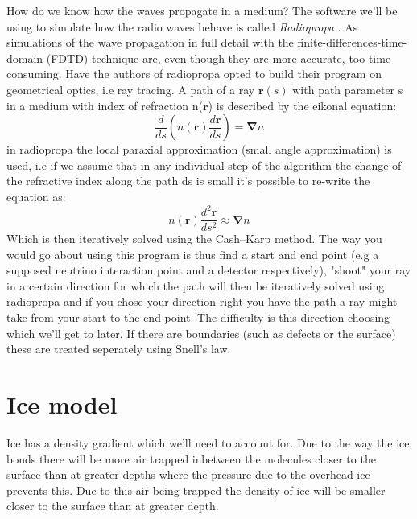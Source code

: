 \documentclass[11pt,a4paper,faculty=we,language=en,doctype=report]{cls/ugent-doc}
\begin{document}
How do we know how the waves propagate in a medium?  The software we'll be
using to simulate how the radio waves behave is called \textit{Radiopropa}
\cite{Winchen_2019}. As  simulations of the wave propagation in full detail
with the finite-differences-time-domain (FDTD) technique \cite{1138693} are,
even though they are more accurate, too time consuming. Have the authors of
radiopropa opted to build their program on geometrical optics, i.e ray
tracing. A path of a ray $\mathbf{r}(s)$ with path parameter s in a medium
with index of refraction n($\mathbf{r}$) is described by the eikonal
equation\cite{herman2019treatise}:
\begin{equation}
	\frac{d}{ds}\left(n(\mathbf{r})\frac{d\mathbf{r}}{ds}\right) = \mathbf{\nabla} n
\end{equation}
in radiopropa the local paraxial approximation (small angle approximation) is
used, i.e if we assume that in any individual step of the algorithm the change
of the refractive index along the path ds is small it's possible to re-write
the equation as:
\begin{equation}
	n(\mathbf{r})\frac{d^2\mathbf{r}}{ds^2} \approx \mathbf{\nabla} n
	\label{eqn:radiopropaformula}
\end{equation}
Which is then iteratively solved using the Cash–Karp method.  The way you would
go about using this program is thus find a start and end point (e.g a supposed
neutrino interaction point and a detector respectively), "shoot" your ray in a
certain direction for which the path will then be iteratively solved using
radiopropa and if you chose your direction right you have the path a ray might
take from your start to the end point.  The difficulty is this direction
choosing which we'll get to later.  If there are boundaries (such as defects or
the surface) these are treated seperately using Snell's law. 
\section{Ice model}
\label{section:Ice Model}
Ice has a density gradient which we'll need to account for. Due to the way the
ice bonds there will be more air trapped inbetween the molecules closer to the
surface than at greater depths where the pressure due to the overhead ice
prevents this.  Due to this air being trapped the density of ice will be
smaller closer to the surface than at greater depth.  
\end{document}
